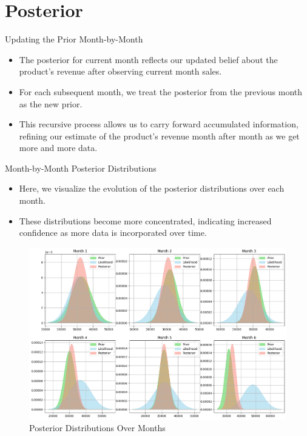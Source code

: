 \section{Posterior}

\begin{frame}{Updating the Prior Month-by-Month}

  \begin{itemize}
    \item The posterior for current month reflects our updated belief about the product's revenue after observing current month sales.
    \item For each subsequent month, we treat the posterior from the previous month as the new prior.
    \item This recursive process allows us to carry forward accumulated information, refining our estimate of the product's revenue month after month as we get more and more data.
  \end{itemize}
  
\end{frame}

\begin{frame}{Month-by-Month Posterior Distributions}

  \begin{itemize}
    \item Here, we visualize the evolution of the posterior distributions over each month.
    \item These distributions become more concentrated, indicating increased confidence as more data is incorporated over time.
  \end{itemize}

\begin{figure}
  \centering
  \includegraphics[width=.6\linewidth]{../Report/images/months.png}
  \caption{Posterior Distributions Over Months}
\end{figure}
  
\end{frame}
